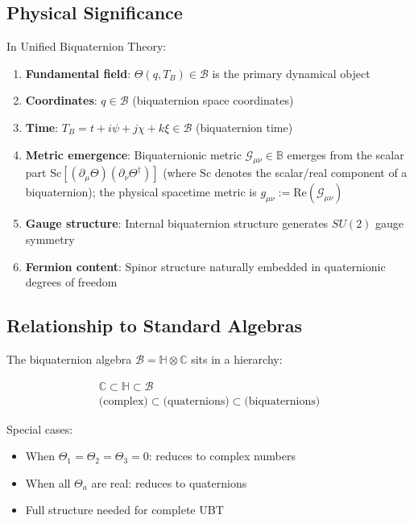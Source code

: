 \subsection{Physical Significance}

In Unified Biquaternion Theory:

\begin{enumerate}
    \item \textbf{Fundamental field}: $\Theta(q, T_B) \in \mathcal{B}$ is the primary dynamical object
    
    \item \textbf{Coordinates}: $q \in \mathcal{B}$ (biquaternion space coordinates)
    
    \item \textbf{Time}: $T_B = t + i\psi + j\chi + k\xi \in \mathcal{B}$ (biquaternion time)
    
    \item \textbf{Metric emergence}: Biquaternionic metric $\mathcal{G}_{\mu\nu} \in \mathbb{B}$ emerges from the scalar part $\text{Sc}[(\partial_\mu\Theta)(\partial_\nu\Theta^\dagger)]$ (where $\text{Sc}$ denotes the scalar/real component of a biquaternion); the physical spacetime metric is $g_{\mu\nu} := \text{Re}(\mathcal{G}_{\mu\nu})$
    
    \item \textbf{Gauge structure}: Internal biquaternion structure generates $SU(2)$ gauge symmetry
    
    \item \textbf{Fermion content}: Spinor structure naturally embedded in quaternionic degrees of freedom
\end{enumerate}

\subsection{Relationship to Standard Algebras}

The biquaternion algebra $\mathcal{B} = \mathbb{H} \otimes \mathbb{C}$ sits in a hierarchy:

\begin{equation}
\boxed{
\begin{array}{c}
\mathbb{C} \subset \mathbb{H} \subset \mathcal{B} \\
\text{(complex)} \subset \text{(quaternions)} \subset \text{(biquaternions)}
\end{array}
}
\end{equation}

Special cases:
\begin{itemize}
    \item When $\Theta_1 = \Theta_2 = \Theta_3 = 0$: reduces to complex numbers
    \item When all $\Theta_a$ are real: reduces to quaternions
    \item Full structure needed for complete UBT
\end{itemize}

